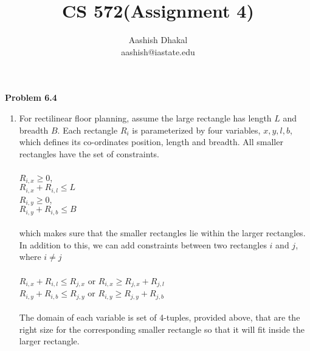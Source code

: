 \documentclass[11pt]{article}
\newcommand\tab[1][1cm]{\hspace*{#1}}
\begin{document}
\title{CS 572(Assignment 4)} %
\author{Aashish Dhakal\\ %
aashish@iastate.edu\\%
 }      %
\date{}


\maketitle
\section*{}

\textbf{Problem 6.4}
\begin{enumerate}[label=(\alph*)]
  \item For rectilinear floor planning,
  assume the large rectangle has length $L$ and breadth $B$. Each rectangle $R_i$ is parameterized by
  four variables, $x, y, l, b$, which defines its co-ordinates position, length and breadth. All smaller rectangles have
  the set of constraints.\\ \\
  \tab \tab \tab \tab $R_{i,x} \geq 0$,\\ \tab \tab \tab \tab $R_{i,x} + R_{i,l} \leq L$ \\
  \tab \tab \tab \tab $R_{i,y} \geq 0$, \\ \tab \tab \tab \tab $R_{i,y} + R_{i,b} \leq B$ \\ \\
  which makes sure that the smaller rectangles lie within the larger rectangles. In addition to this, we can add constraints
  between two rectangles $i$ and $j$, where $ i \neq j$ \\ \\
  \tab \tab \tab $R_{i,x} + R_{i,l} \leq R_{j,x}$  or  $R_{i,x} \geq R_{j,x} + R_{j,l}$ \\
  \tab \tab \tab $R_{i,y} + R_{i,b} \leq R_{j,y}$  or  $R_{i,y} \geq R_{j,y} + R_{j,b}$ \\
  \\
  The domain of each variable is set of 4-tuples, provided above, that are the right size for the corresponding smaller
  rectangle so that it will fit inside the larger rectangle. \\


\end{enumerate}
\end{document}
